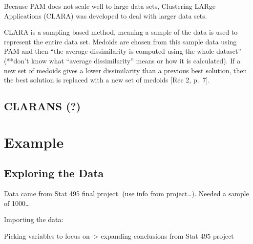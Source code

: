 \documentclass[12pt,twoside]{amherstthesis}
\begin{document}
  Because PAM does not scale well to large data sets, Clustering LARge
  Applications (CLARA) was developed to deal with larger data sets.
  
  CLARA is a sampling based method, meaning a sample of the data is used
  to represent the entire data set. Medoids are chosen from this sample
  data using PAM and then ``the average dissimilarity is computed using
  the whole dataset'' (**don't know what ``average dissimilarity'' means
  or how it is calculated). If a new set of medoids gives a lower
  dissimilarity than a previous best solution, then the best solution is
  replaced with a new set of medoids {[}Rec 2, p.~7{]}.
  
  \section{CLARANS (?)}\label{clarans}
  
  \chapter{Example}\label{typeset-equ}
  
  \section{Exploring the Data}\label{exploring-the-data}
  
  Data came from Stat 495 final project. (use info from project\ldots{}).
  Needed a sample of 1000\ldots{}
  
  Importing the data:
  
  \begin{Shaded}
  \begin{Highlighting}[]
  \StringTok{ }\NormalTok{(}\NormalTok{)}
  
  \NormalTok{(}\NormalTok{)}
  \StringTok{ }\NormalTok{data_subset[}\NormalTok{(}\OperatorTok{:}\NormalTok{,}
     \NormalTok{),]}
  \end{Highlighting}
  \end{Shaded}
  
  Picking variables to focus on--\textgreater{} expanding conclusions from
  Stat 495 project
  
\end{document}
